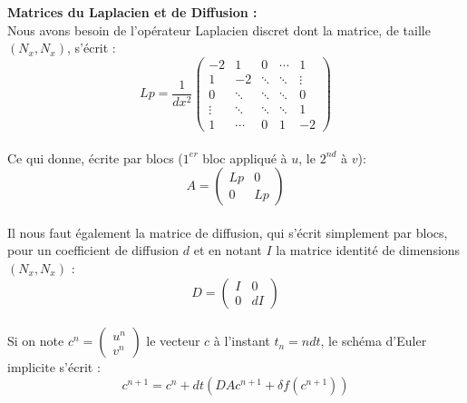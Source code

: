 \documentclass{report}
\begin{document}
\textbf{Matrices du Laplacien et de Diffusion :}\\
Nous avons besoin de l'op\'erateur Laplacien discret dont la matrice, de taille  $(N_x, N_x)$, s'\'ecrit  : \\
\begin{displaymath}
Lp = \frac{1}{dx^2} \begin{pmatrix} 
-2     & 1     & 0      & \cdots & 1\\
 1     & -2    & \ddots & \ddots & \vdots\\
 0     &\ddots & \ddots & \ddots & 0\\
\vdots & \ddots& \ddots & \ddots & 1\\
1      &\cdots & 0      &    1   & -2
\end{pmatrix}
\end{displaymath}\\

Ce qui donne, \'ecrite par blocs ($1^{er}$ bloc appliqu\'e \`a $u$, le $2^{nd}$ \`a $v$):\\
\begin{displaymath}
A = \begin{pmatrix} 
Lp  & 0 \\
 0  & Lp
\end{pmatrix}
\end{displaymath}\\

Il nous faut \'egalement la matrice de diffusion, qui s'\'ecrit simplement par blocs, pour un coefficient de diffusion $d$ et en notant $I$ la matrice identit\'e de dimensions $(N_x, N_x)$ :\\
\begin{displaymath}
D = \begin{pmatrix} 
I  & 0 \\
 0  & dI
\end{pmatrix}
\end{displaymath}\\

Si on note $c^n = \begin{pmatrix} u^n \\ v^n \end{pmatrix}$ le vecteur $c$ \`a l'instant $t_n = n dt$, le sch\'ema d'Euler implicite s'\'ecrit :\\
\begin{equation}
c^{n+1} = c^n + dt (DA c^{n+1} + \delta f(c^{n+1}))
\end{equation}\\
\end{document}
